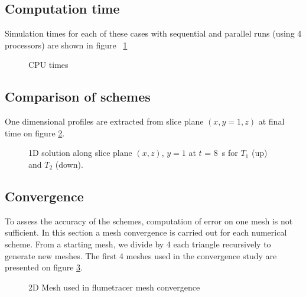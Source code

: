 \subsection{Computation time}

Simulation times for each of these cases with sequential and parallel runs
(using 4 processors) are shown in figure ~\ref{fig:flumetracer:cputime}

\begin{figure}[H]
  \centering
  \caption{CPU times}\label{fig:flumetracer:cputime}
\end{figure}


\subsection{Comparison of schemes}

One dimensional profiles are extracted from
slice plane $(x,y=1,z)$ at final time on figure \ref{t2d:flumetracer:1dslice}.

\begin{figure}[H]
\centering
{}
\centering
{}
\caption{1D solution along slice plane $(x,z)$, $y=1$ at $t$ = 8~s for $T_1$ (up) and $T_2$ (down).}
\label{t2d:flumetracer:1dslice}
\end{figure}


\newpage
\subsection{Convergence}
To assess the accuracy of the schemes, computation of error on one mesh is not sufficient.
In this section a mesh convergence is carried out for each numerical scheme. From a starting mesh,
we divide by 4 each triangle recursively to generate new meshes.
The first 4 meshes used in the convergence study are presented on figure \ref{t2d:flumetracer:meshes}.

\begin{figure}[h!]
\begin{minipage}[t]{0.9\textwidth}
 \centering
\end{minipage}
\begin{minipage}[t]{0.9\textwidth}
 \centering
\end{minipage}
\begin{minipage}[t]{0.9\textwidth}
 \centering
\end{minipage}
\begin{minipage}[t]{0.9\textwidth}
 \centering
\end{minipage}
 \caption{2D Mesh used in flumetracer mesh convergence}
 \label{t2d:flumetracer:meshes}
\end{figure}

